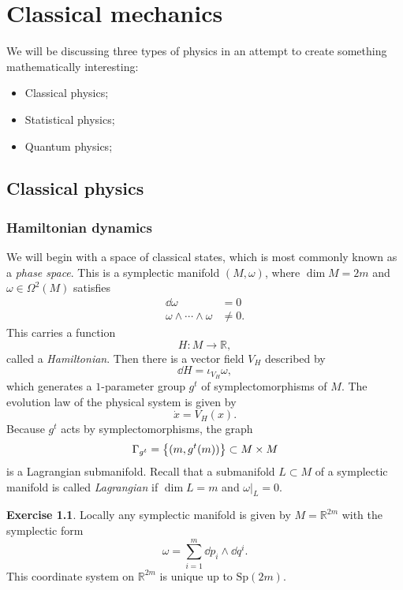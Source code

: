 \documentclass[leqno, openany]{memoir}
\theoremstyle{definition}
\newtheorem{exer}[thm]{Exercise}
\theoremstyle{remark}
\theoremstyle{plain}
\theoremstyle{definition}
\theoremstyle{remark}
\newcommand{\R}{\mathbb{R}}
\newcommand{\mr}[1]{\mathrm{#1}}
\begin{document}
\newpage

\tableofcontents

\chapter{Classical mechanics}
\label{cha:intro}

We will be discussing three types of physics in an attempt to create something mathematically interesting:
\begin{itemize}
\item Classical physics;
\item Statistical physics;
\item Quantum physics;
\end{itemize}

\section{Classical physics}
\label{sec:classical}

\subsection{Hamiltonian dynamics}
\label{subsec:hamiltonian}

We will begin with a space of classical states, which is most commonly known as a \textit{phase space}. This is a symplectic manifold $(M, \omega)$, where $\dim M = 2m$ and $\omega \in \Omega^2(M)$ satisfies
\begin{align*}
  \dd{\omega} &= 0 \\
  \omega \wedge \cdots \wedge \omega &\neq 0.
\end{align*}
This carries a function
\[ H \colon M \to \R, \]
called a \textit{Hamiltonian}. Then there is a vector field $V_H$ described by
\[ \dd{H} = \iota_{V_H} \omega, \]
which generates a $1$-parameter group $g^t$ of symplectomorphisms of $M$. The evolution law of the physical system is given by
\[ \dot{x} = V_H(x). \]
Because $g^t$ acts by symplectomorphisms, the graph
\[ \Gamma_{g^t} = \qty{(m, g^t(m))} \subset M \times M \]
is a Lagrangian submanifold. Recall that a submanifold $L \subset M$ of a symplectic manifold is called \textit{Lagrangian} if $\dim L = m$ and $\omega |_L = 0$.

\begin{exer}
  Locally any symplectic manifold is given by $M = \R^{2m}$ with the symplectic form
  \[ \omega = \sum_{i=1}^m \dd{p_i} \wedge \dd{q^i}. \]
  This coordinate system on $\R^{2m}$ is unique up to $\mr{Sp}(2m)$.
\end{exer}
\end{document}
